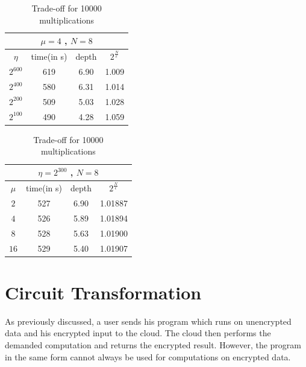 \documentclass{acm_proc_article-sp}
\begin{document}
 
\begin{table}[htb]
  \centering
  \caption{Trade-off for 10000 multiplications}
\begin{tabular}{|c|c|c|c||}
  \hline
  \multicolumn{4}{|c||}{$\mu = 4$ , $N=8$} \\
  \hline
  $\eta$ &  time(in s)  & depth & $2^{\frac{N}{\epsilon}}$ \\
  \hline
  $2^{600}$ & 619  & 6.90 & 1.009 \\
  $2^{400}$ &  580 & 6.31 & 1.014 \\
  $2^{200}$ &  509 & 5.03 & 1.028 \\
  $2^{100}$ &  490 & 4.28 & 1.059 \\
   \hline
\end{tabular}
\normalsize
\label{tab:tradeofftab1}
\end{table}

\begin{table}[htb]
  \centering
  \caption{Trade-off for 10000 multiplications}
\begin{tabular}{|c|c|c|c||}
  \hline
  \multicolumn{4}{|c||}{$\eta = 2^{300}$ , $N=8$} \\
  \hline
  $\mu$ &  time(in s)  & depth & $2^{\frac{N}{\epsilon}}$ \\
  \hline
  $2$ & 527  & 6.90 & 1.01887 \\
  $4$ & 526 & 5.89 & 1.01894 \\
  $8$ & 528  & 5.63 & 1.01900 \\
  $16$ & 529  & 5.40 & 1.01907 \\
   \hline
\end{tabular}
\normalsize
\label{tab:tradeofftab2}
\end{table}




\section{Circuit Transformation}
As previously discussed, a user sends his program which runs on unencrypted data and his encrypted input to the cloud. The cloud then performs the demanded computation and returns the encrypted result. However, the program in the same form cannot always be used for computations on encrypted data. 
\end{document}
